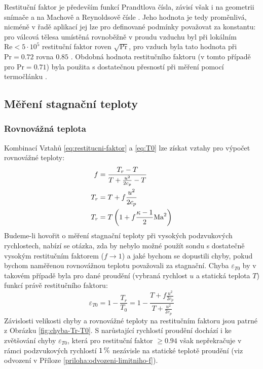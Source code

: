    Restituční faktor je především funkcí Prandtlova čísla, závisí však i na geometrii snímače a na Machově a Reynoldsově čísle \cite{Leontiev2017a}. Jeho hodnota je tedy proměnlivá, nicméně v řadě aplikací jej lze pro definované podmínky považovat za konstantu: pro válcová tělesa umístěná rovnoběžně v proudu vzduchu byl při lokálním $\textrm{Re} < 5 \cdot 10^5$ restituční faktor roven $\sqrt{\textrm{Pr}}$, pro vzduch byla tato hodnota při $\textrm{Pr} = 0.72$ rovna $0.85$ \cite{Shapiro1954}. Obdobná hodnota restitučního faktoru (v tomto případě pro $\textrm{Pr}=0.71$) byla použita s dostatečnou přesností při měření pomocí termočlánku \cite{Ishibashi2012}.

    \subsection{Měření stagnační teploty}
        \subsubsection{Rovnovážná teplota}
            Kombinací Vztahů \ref{eq:restitucni-faktor} a \ref{eq:T0} lze získat vztahy pro výpočet rovnovážné teploty:
            \begin{align}
                f &= \frac{T_r - T}{T + \frac{u^2}{2 c_p} - T} \\
                T_r &= T + f \frac{u^2}{2 c_p} \\
                T_r &= T \left( 1 + f \frac{\kappa - 1}{2} \textrm{Ma} ^2 \right)
            \end{align}
            \noindent Budeme-li hovořit o měření stagnační teploty při vysokých podzvukových rychlostech, nabízí se otázka, zda by nebylo možné použít sondu s dostatečně vysokým restitučním faktorem ($f \rightarrow 1$) a jaké bychom se dopustili chyby, pokud bychom naměřenou rovnovážnou teplotu považovali za stagnační. Chyba $\varepsilon _{T0}$ by v takovém případě byla pro dané proudění (vybraná rychlost $u$ a statická teplota $T$) funkcí právě restitučního faktoru:
            \begin{equation}
                \varepsilon _{T0} = 1 - \frac{T_r}{T_0} = 1 - \frac{T + f \frac{u^2}{2 c_p}}{T + \frac{u^2}{2 c_p}}
            \end{equation}
            \noindent Závislosti velikosti chyby a rovnovážné teploty na restitučním faktoru jsou patrné z Obrázku \ref{fig:chyba-Tr-T0}. S narůstající rychlostí proudění dochází i ke zvětšování chyby $\varepsilon _{T0}$, která pro restituční faktor $\geq 0.94$ však nepřekračuje v rámci podzvukových rychlostí $1 \, \%$ nezávisle na statické teplotě proudění (viz odvození v Příloze \ref{priloha:odvozeni-limitniho-f}). 

